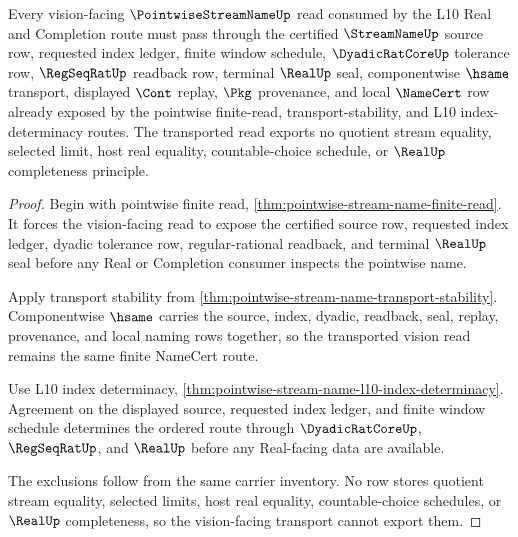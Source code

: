 \begin{theorem}
\label{thm:pointwise-stream-vision-transport}
Every vision-facing $\PointwiseStreamNameUp$ read consumed by the L10 Real and Completion route must pass through the certified $\StreamNameUp$ source row, requested index ledger, finite window schedule, $\DyadicRatCoreUp$ tolerance row, $\RegSeqRatUp$ readback row, terminal $\RealUp$ seal, componentwise $\hsame$ transport, displayed $\Cont$ replay, $\Pkg$ provenance, and local $\NameCert$ row already exposed by the pointwise finite-read, transport-stability, and L10 index-determinacy routes. The transported read exports no quotient stream equality, selected limit, host real equality, countable-choice schedule, or $\RealUp$ completeness principle.
\end{theorem}
\begin{proof}
Begin with pointwise finite read, \autoref{thm:pointwise-stream-name-finite-read}. It forces the vision-facing read to expose the certified source row, requested index ledger, dyadic tolerance row, regular-rational readback, and terminal $\RealUp$ seal before any Real or Completion consumer inspects the pointwise name.

Apply transport stability from \autoref{thm:pointwise-stream-name-transport-stability}. Componentwise $\hsame$ carries the source, index, dyadic, readback, seal, replay, provenance, and local naming rows together, so the transported vision read remains the same finite NameCert route.

Use L10 index determinacy, \autoref{thm:pointwise-stream-name-l10-index-determinacy}. Agreement on the displayed source, requested index ledger, and finite window schedule determines the ordered route through $\DyadicRatCoreUp$, $\RegSeqRatUp$, and $\RealUp$ before any Real-facing data are available.

The exclusions follow from the same carrier inventory. No row stores quotient stream equality, selected limits, host real equality, countable-choice schedules, or $\RealUp$ completeness, so the vision-facing transport cannot export them.
\end{proof}


